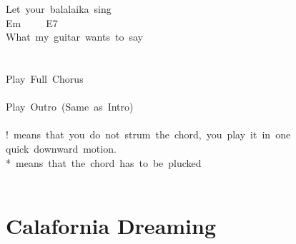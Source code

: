 \documentclass[]{book}
\let\stdsection\section
\renewcommand\section{\clearpage\stdsection}
\begin{document}
Let~your~balalaika~sing\\
\hspace*{0.333em}\hspace*{0.333em}\hspace*{0.333em}\hspace*{0.333em}\hspace*{0.333em}\hspace*{0.333em}\hspace*{0.333em}\hspace*{0.333em}\hspace*{0.333em}\hspace*{0.333em}\hspace*{0.333em}\hspace*{0.333em}\hspace*{0.333em}\hspace*{0.333em}\hspace*{0.333em}\hspace*{0.333em}\hspace*{0.333em}\hspace*{0.333em}\hspace*{0.333em}\hspace*{0.333em}\hspace*{0.333em}\hspace*{0.333em}\hspace*{0.333em}\hspace*{0.333em}Em~~~~~E7\\
What~my~guitar~wants~to~say\\
~\\
~\\
Play~Full~Chorus\\
~\\
Play~Outro~(Same~as~Intro)\\
~\\
!~means~that~you~do~not~strum~the~chord,~you~play~it~in~one~\\
\hspace*{0.333em}\hspace*{0.333em}quick~downward~motion.\\
*~means~that~the~chord~has~to~be~plucked\\
~\\

\hypertarget{calafornia-dreaming}{%
\section{Calafornia Dreaming}\label{calafornia-dreaming}}
\end{document}
